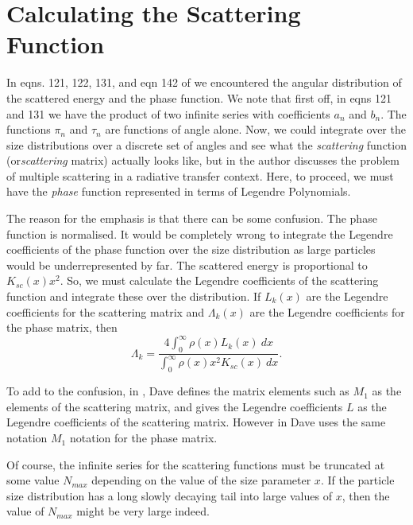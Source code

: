 \section{ Calculating the Scattering Function}

In eqns. 121, 122, 131, and eqn 142 of \cite{EMScatt:Mybib} we encountered the angular
 distribution of the scattered energy and the phase function.
We note that first off, in eqns 121 and 131 we have the product of two 
infinite series with  coefficients $a_n$ and $b_n$.
The functions $\pi_n$ and $\tau_n$ are functions of angle alone.
 Now, we could integrate over the size distributions
over a discrete set of angles and see what the {\it scattering} function
 (or{\it  scattering} matrix) actually looks like, but in
 \cite{Vector:Mybib} the author discusses the problem of 
multiple scattering in a radiative transfer context. Here,
 to proceed, we must have the {\it phase } function represented in
 terms of Legendre Polynomials. 

The reason for the emphasis is that there can be some confusion. The phase function
is normalised. It would be completely wrong to integrate the Legendre
coefficients of the phase function over the size distribution as large
 particles would be underrepresented
by far. The scattered energy is proportional to $K_{sc}(x) x^2$. So, we must
calculate the Legendre coefficients of the scattering function and integrate these
over the distribution. If $L_k(x)$ are the Legendre coefficients for the
 scattering matrix
and $\Lambda_k(x)$ are the Legendre coefficients for the phase matrix, then
\begin{equation}
\Lambda_k=\frac{ 
4\int_0^\infty \rho(x) L_k(x) \> dx }{
\int_0^\infty \rho(x) x^2 K_{sc}(x) \> dx }.
\end{equation}


To add to the confusion,
in \cite{Dave1:Mybib}, Dave defines the matrix elements such as $M_1$ as
the elements of the scattering matrix, and gives the Legendre coefficients $L$
as the Legendre coefficients of the scattering matrix. However in \cite{Dave2:Mybib}
Dave uses the same notation $M_1$ notation for the phase matrix.


Of course, the infinite series for the  scattering functions must 
be truncated at some value 
$N_{max}$ depending on the value 
of the size parameter $x$. If the particle size distribution 
has a long slowly decaying tail into large values of  $x$, then the 
value of $N_{max}$ might be very large indeed.


